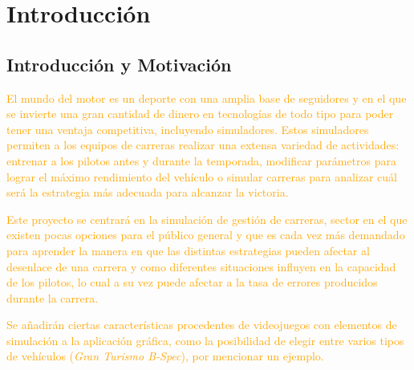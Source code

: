 \documentclass[a4paper,11pt]{book}
\begin{document}



\tableofcontents
\newpage
%
\chapter{Introducción}
\section{Introducción y Motivación}


\textcolor{orange}{El mundo del motor es un deporte con una amplia base de seguidores y en el que se invierte una gran cantidad de dinero en tecnologías de todo tipo para poder tener una ventaja competitiva, incluyendo simuladores. Estos simuladores permiten a los equipos de carreras realizar una extensa variedad de actividades: entrenar a los pilotos antes y durante la temporada, modificar parámetros para lograr el máximo rendimiento del vehículo o simular carreras para analizar cuál será la estrategia más adecuada para alcanzar la victoria.}

\bigskip


\textcolor{orange}{Este proyecto se centrará en la simulación de gestión de carreras, sector en el que existen pocas opciones para el público general y que es cada vez más demandado para aprender la manera en que las distintas estrategias pueden afectar al desenlace de una carrera y como diferentes situaciones influyen en la capacidad de los pilotos, lo cual a su vez puede afectar a la tasa de errores producidos durante la carrera.}

\bigskip

\textcolor{orange}{Se añadirán ciertas características procedentes de videojuegos con elementos de simulación a la aplicación gráfica, como la posibilidad de elegir entre varios tipos de vehículos (\textit{Gran Turismo B-Spec}), por mencionar un ejemplo.}
\end{document}
